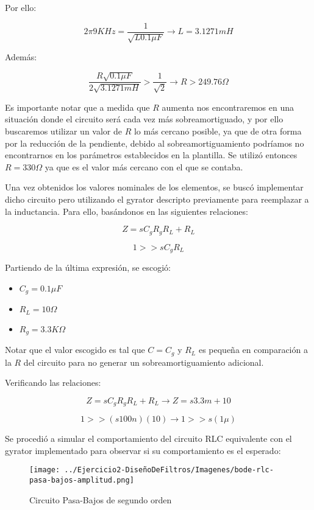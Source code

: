 Por ello:

$$2\pi 9KHz=\frac{1}{\sqrt{L0.1 \mu F}} \longrightarrow L = 3.1271 mH$$

Además:

$$\frac{R\sqrt{0.1\mu F}}{2\sqrt{3.1271mH}} > \frac{1}{\sqrt{2}} \longrightarrow R > 249.76 \Omega $$

Es importante notar que a medida que $R$ aumenta nos encontraremos en una situación donde el circuito será
cada vez más sobreamortiguado, y por ello buscaremos utilizar un valor de $R$ lo más cercano posible, ya que de otra forma
por la reducción de la pendiente, debido al sobreamortiguamiento podríamos no encontrarnos en los parámetros establecidos en la plantilla. 
Se utilizó entonces $R= 330 \Omega$ ya que es el valor más cercano con el que se contaba.

Una vez obtenidos los valores nominales de los elementos, se buscó implementar dicho circuito pero utilizando el gyrator descripto previamente
para reemplazar a la inductancia. Para ello, basándonos 
en las siguientes relaciones:

$$Z=sC_gR_gR_L+R_L$$

$$1 >> sC_gR_L$$

Partiendo de la última expresión, se escogió:

\begin{itemize}
	\item $C_g=0.1 \mu F$
	\item $R_L=10 \Omega$
	\item $R_g=3.3K \Omega$
\end{itemize}

Notar que el valor escogido es tal que $C=C_g$ y $R_L$ es pequeña en comparación a la $R$ del circuito para no generar
un sobreamortiguamiento adicional.

Verificando las relaciones:

$$Z=sC_gR_gR_L+R_L \longrightarrow Z = s3.3m + 10$$

$$1 >> (s100n)(10) \longrightarrow 1  >> s(1\mu)$$

Se procedió a simular el comportamiento del circuito RLC equivalente con el gyrator implementado para observar si su comportamiento es el esperado:


\begin{figure}[H]
    \centering
    \texttt{[image: ../Ejercicio2-DiseñoDeFiltros/Imagenes/bode-rlc-pasa-bajos-amplitud.png]}
    \caption{Circuito Pasa-Bajos de segundo orden}
\end{figure}

